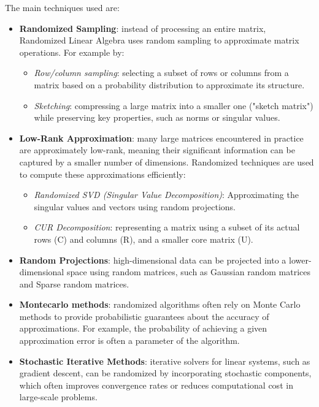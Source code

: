 \documentclass[11pt,a4paper]{article}
\begin{document}
The main techniques used are:
\begin{itemize}
    \item \textbf{Randomized Sampling}: instead of processing an entire matrix, Randomized Linear Algebra uses random sampling to approximate matrix operations. For example by:
    \begin{itemize}
    \item \textit{Row/column sampling}: selecting a subset of rows or columns from a matrix based on a probability distribution to approximate its structure.
    \item \textit{Sketching}: compressing a large matrix into a smaller one ("sketch matrix") while preserving key properties, such as norms or singular values.
    \end{itemize}
    \item \textbf{Low-Rank Approximation}: many large matrices encountered in practice are approximately low-rank, meaning their significant information can be captured by a smaller number of dimensions. Randomized techniques are used to compute these approximations efficiently:
    \begin{itemize}
        \item \textit{Randomized SVD (Singular Value Decomposition)}: Approximating the singular values and vectors using random projections.
        \item \textit{CUR Decomposition}: representing a matrix using a subset of its actual rows (C) and columns (R), and a smaller core matrix (U).
    \end{itemize}
    \item \textbf{Random Projections}: high-dimensional data can be projected into a lower-dimensional space using random matrices, such as Gaussian random matrices and Sparse random matrices.
    \item \textbf{Montecarlo methods}: randomized algorithms often rely on Monte Carlo methods to provide probabilistic guarantees about the accuracy of approximations. For example, the probability of achieving a given approximation error is often a parameter of the algorithm.
    \item \textbf{Stochastic Iterative Methods}: iterative solvers for linear systems, such as gradient descent, can be randomized by incorporating stochastic components, which often improves convergence rates or reduces computational cost in large-scale problems.
\end{itemize}
\end{document}
